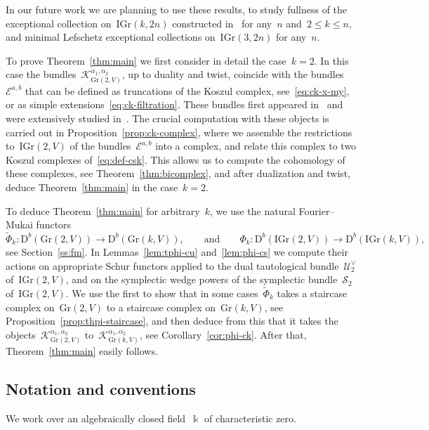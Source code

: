 \documentclass[a4paper]{article}
\newcommand{\Gr}{\mathrm{Gr}}
\newcommand{\IGr}{\mathrm{IGr}}
\newcommand{\Db}{{\mathrm{D}^b}}
\newcommand{\cE}{\mathcal{E}}
\newcommand{\cK}{\mathcal{K}}
\newcommand{\cU}{\mathcal{U}}
\newcommand{\cS}{\mathcal{S}}
\theoremstyle{remark}
\theoremstyle{definition}
\begin{document}
In our future work we are planning to use these results, to study fullness 
of the exceptional collection on~\(\IGr(k,2n)\) constructed in~\cite{KuzPol} for any~\(n\) and~\(2 \le k \le n\), and minimal Lefschetz exceptional collections on~\(\IGr(3, 2n)\) for any~\(n\).


To prove Theorem~\ref{thm:main} we first consider in detail the case~\(k = 2\).
In this case the bundles~\(\cK_{\Gr(2,V)}^{\alpha_1,\alpha_2}\), 
up to duality and twist, coincide with the bundles~\(\cE^{a,b}\)
that can be defined as truncations of the Koszul complex, see~\eqref{eq:ck-x-my},
or as simple extensions~\eqref{eq:ck-filtration}.
These bundles first appeared in~\cite[Conjecture~9.8]{KuzPol} and were extensively studied in~\cite{F15}.
The crucial computation with these objects is carried out in Proposition~\ref{prop:ck-complex},
where we assemble the restrictions to~\(\IGr(2,V)\) of the bundles~\(\cE^{a,b}\) into a complex,
and relate this complex to two Koszul complexes of~\eqref{eq:def-csk}.
This allows us to compute the cohomology of these complexes, see Theorem~\ref{thm:bicomplex},
and after dualization and twist, deduce Theorem~\ref{thm:main} in the case~\(k = 2\). 

To deduce Theorem~\ref{thm:main} for arbitrary~\(k\), 
we use the natural Fourier--Mukai functors
\begin{equation*}
\tilde\Phi_k \colon \Db(\Gr(2,V)) \to \Db(\Gr(k,V)), 
\qquad\text{and}\qquad
\Phi_k \colon \Db(\IGr(2,V)) \to \Db(\IGr(k,V)), 
\end{equation*}
see Section~\ref{ss:fm}.
In Lemmas~\ref{lem:tphi-cu} and~\ref{lem:phi-cs} we compute their actions
on appropriate Schur functors applied to the dual tautological bundle~\(\cU_2^\vee\) of~\(\IGr(2,V)\),
and on the symplectic wedge powers of the symplectic bundle~\(\cS_2\) of~\(\IGr(2,V)\).
We use the first to show that in some cases~\(\tilde\Phi_k\) 
takes a staircase complex on~\(\Gr(2,V)\) to a staircase complex on~\(\Gr(k,V)\),
see Proposition~\ref{prop:thpi-staircase},
and then deduce from this that 
it takes the objects~\(\cK_{\Gr(2,V)}^{\alpha_1,\alpha_2}\) to~\(\cK_{\Gr(k,V)}^{\alpha_1,\alpha_2}\),
see Corollary~\ref{cor:phi-ck}.
After that, Theorem~\ref{thm:main} easily follows.


\subsection*{Notation and conventions}

We work over an algebraically closed field~\(\Bbbk\) of characteristic zero.
\end{document}
